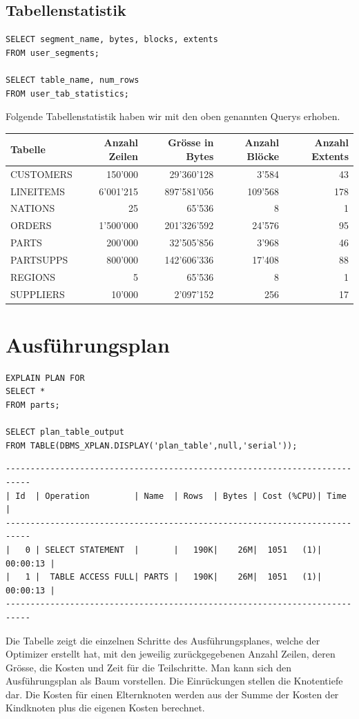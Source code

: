 \documentclass[10pt]{article}
\begin{document}
\subsection{Tabellenstatistik}
\begin{lstlisting}[style=sql]
SELECT segment_name, bytes, blocks, extents
FROM user_segments;

SELECT table_name, num_rows
FROM user_tab_statistics;
\end{lstlisting}
Folgende Tabellenstatistik haben wir mit den oben genannten Querys erhoben.

\begin{tabular}{l||r|r|r|r}
  Tabelle & Anzahl Zeilen & Grösse in Bytes & Anzahl Blöcke & Anzahl Extents \\ \hline
  \hline
  CUSTOMERS & 150'000 & 29'360'128 & 3'584 & 43 \\ \hline
  LINEITEMS & 6'001'215 & 897'581'056 & 109'568 & 178 \\ \hline
  NATIONS & 25 & 65'536 & 8 & 1 \\ \hline
  ORDERS & 1'500'000 & 201'326'592 & 24'576 & 95 \\ \hline
  PARTS & 200'000 & 32'505'856 & 3'968 & 46 \\ \hline
  PARTSUPPS & 800'000 & 142'606'336 & 17'408 & 88 \\ \hline
  REGIONS & 5 & 65'536 & 8 & 1 \\ \hline
  SUPPLIERS & 10'000 & 2'097'152 & 256 & 17 \\
\end{tabular}	

\section{Ausführungsplan}
\begin{lstlisting}[style=sql]
EXPLAIN PLAN FOR
SELECT *
FROM parts;

SELECT plan_table_output
FROM TABLE(DBMS_XPLAN.DISPLAY('plan_table',null,'serial'));
\end{lstlisting}
\begin{lstlisting}[style=queryexecutionplan]
---------------------------------------------------------------------------
| Id  | Operation         | Name  | Rows  | Bytes | Cost (%CPU)| Time     |
---------------------------------------------------------------------------
|   0 | SELECT STATEMENT  |       |   190K|    26M|  1051   (1)| 00:00:13 |
|   1 |  TABLE ACCESS FULL| PARTS |   190K|    26M|  1051   (1)| 00:00:13 |
---------------------------------------------------------------------------
\end{lstlisting}
Die Tabelle zeigt die einzelnen Schritte des Ausführungsplanes, welche der 
Optimizer erstellt hat, mit den jeweilig zurückgegebenen Anzahl Zeilen, deren 
Grösse, die Kosten und Zeit für die Teilschritte. Man kann sich den 
Ausführungsplan als Baum vorstellen. Die Einrückungen stellen die Knotentiefe 
dar. Die Kosten für einen Elternknoten werden aus der Summe der Kosten der 
Kindknoten plus die eigenen Kosten berechnet.
\end{document}

